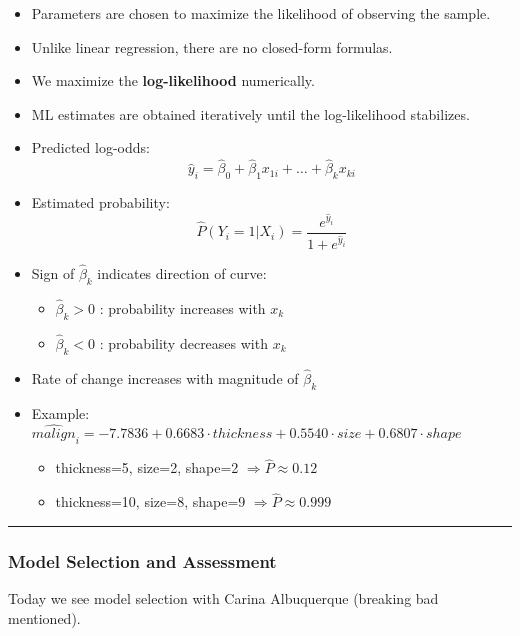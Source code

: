 \begin{itemize}
    \item Parameters are chosen to maximize the likelihood of observing the sample.
    \item Unlike linear regression, there are no closed-form formulas.
    \item We maximize the \textbf{log-likelihood} numerically.
    \item ML estimates are obtained iteratively until the log-likelihood stabilizes.
    \item Predicted log-odds:
    \[
        \hat{y}_i = \hat{\beta}_0 + \hat{\beta}_1 x_{1i} + \dots + \hat{\beta}_k x_{ki}
    \]
    \item Estimated probability:
    \[
        \hat{P}(Y_i=1|X_i) = \frac{e^{\hat{y}_i}}{1+e^{\hat{y}_i}}
    \]
    \item Sign of \(\hat{\beta}_k\) indicates direction of curve:
    \begin{itemize}
        \item \(\hat{\beta}_k > 0\) : probability increases with \(x_k\)
        \item \(\hat{\beta}_k < 0\) : probability decreases with \(x_k\)
    \end{itemize}
    \item Rate of change increases with magnitude of \(\hat{\beta}_k\)
    \item Example: \(\hat{malign}_i = -7.7836 + 0.6683 \cdot thickness + 0.5540 \cdot size + 0.6807 \cdot shape\)
    \begin{itemize}
        \item thickness=5, size=2, shape=2 \(\Rightarrow \hat{P} \approx 0.12\)
        \item thickness=10, size=8, shape=9 \(\Rightarrow \hat{P} \approx 0.999\)
    \end{itemize}
\end{itemize}



\vspace{10pt}

\hrule

\vspace{10pt}

\subsubsection{Model Selection and Assessment}

Today we see model selection with Carina Albuquerque (breaking bad mentioned).

